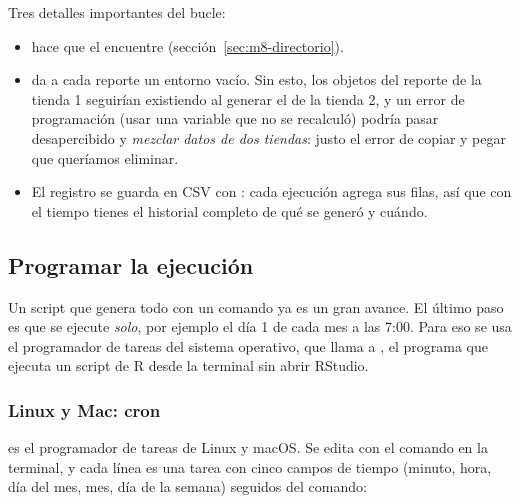 Tres detalles importantes del bucle:

\begin{itemize}
  \item {} hace que el  encuentre
         (sección~\ref{sec:m8-directorio}).
  \item {} da a cada reporte un entorno vacío. Sin
        esto, los objetos del reporte de la tienda 1 seguirían existiendo al
        generar el de la tienda 2, y un error de programación (usar una
        variable que no se recalculó) podría pasar desapercibido y
        \emph{mezclar datos de dos tiendas}: justo el error de copiar y
        pegar que queríamos eliminar.
  \item El registro se guarda en CSV con : cada
        ejecución agrega sus filas, así que con el tiempo tienes el historial
        completo de qué se generó y cuándo.
\end{itemize}

\subsection{Programar la ejecución}

Un script que genera todo con un comando ya es un gran avance. El último
paso es que se ejecute \emph{solo}, por ejemplo el día 1 de cada mes a las
7:00. Para eso se usa el programador de tareas del sistema operativo, que
llama a , el programa que ejecuta un script de R desde la
terminal sin abrir RStudio.

\subsubsection{Linux y Mac: cron}

 es el programador de tareas de Linux y macOS. Se edita con
el comando  en la terminal, y cada línea es una tarea con
cinco campos de tiempo (minuto, hora, día del mes, mes, día de la semana)
seguidos del comando:


